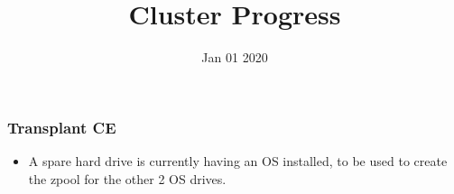 \documentclass{beamer}
\title{Cluster Progress}
\date{Jan 01 2020}
\begin{document}

\begin{frame}
  \maketitle
\end{frame}


\begin{frame}
  \frametitle{Transplant CE}

  \begin{itemize}
  \item A spare hard drive is currently having an OS installed, to be used to create the zpool for the other 2 OS drives.

  \end{itemize}
\end{frame}



\end{document}
